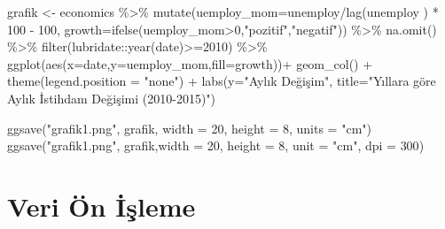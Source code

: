 \documentclass[
  letterpaper,
  DIV=11,
  numbers=noendperiod]{scrreprt}
\newenvironment{Shaded}{\begin{snugshade}}{\end{snugshade}}
\newcommand{\AttributeTok}[1]{\textcolor[rgb]{0.40,0.45,0.13}{#1}}
\newcommand{\DecValTok}[1]{\textcolor[rgb]{0.68,0.00,0.00}{#1}}
\newcommand{\FunctionTok}[1]{\textcolor[rgb]{0.28,0.35,0.67}{#1}}
\newcommand{\NormalTok}[1]{\textcolor[rgb]{0.00,0.23,0.31}{#1}}
\newcommand{\OtherTok}[1]{\textcolor[rgb]{0.00,0.23,0.31}{#1}}
\newcommand{\SpecialCharTok}[1]{\textcolor[rgb]{0.37,0.37,0.37}{#1}}
\newcommand{\StringTok}[1]{\textcolor[rgb]{0.13,0.47,0.30}{#1}}
\begin{document}
\begin{Shaded}
\begin{Highlighting}[]
\NormalTok{grafik }\OtherTok{\textless{}{-}}\NormalTok{ economics }\SpecialCharTok{\%\textgreater{}\%} 
  \FunctionTok{mutate}\NormalTok{(}\AttributeTok{uemploy\_mom=}\NormalTok{unemploy}\SpecialCharTok{/}\FunctionTok{lag}\NormalTok{(unemploy ) }\SpecialCharTok{*} \DecValTok{100} \SpecialCharTok{{-}} \DecValTok{100}\NormalTok{,}
         \AttributeTok{growth=}\FunctionTok{ifelse}\NormalTok{(uemploy\_mom}\SpecialCharTok{\textgreater{}}\DecValTok{0}\NormalTok{,}\StringTok{"pozitif"}\NormalTok{,}\StringTok{"negatif"}\NormalTok{)) }\SpecialCharTok{\%\textgreater{}\%} 
  \FunctionTok{na.omit}\NormalTok{() }\SpecialCharTok{\%\textgreater{}\%} 
  \FunctionTok{filter}\NormalTok{(lubridate}\SpecialCharTok{::}\FunctionTok{year}\NormalTok{(date)}\SpecialCharTok{\textgreater{}=}\DecValTok{2010}\NormalTok{) }\SpecialCharTok{\%\textgreater{}\%} 
  \FunctionTok{ggplot}\NormalTok{(}\FunctionTok{aes}\NormalTok{(}\AttributeTok{x=}\NormalTok{date,}\AttributeTok{y=}\NormalTok{uemploy\_mom,}\AttributeTok{fill=}\NormalTok{growth))}\SpecialCharTok{+}
  \FunctionTok{geom\_col}\NormalTok{() }\SpecialCharTok{+}
  \FunctionTok{theme}\NormalTok{(}\AttributeTok{legend.position =} \StringTok{"none"}\NormalTok{) }\SpecialCharTok{+}
  \FunctionTok{labs}\NormalTok{(}\AttributeTok{y=}\StringTok{"Aylık Değişim"}\NormalTok{,}
       \AttributeTok{title=}\StringTok{"Yıllara göre Aylık İstihdam Değişimi (2010{-}2015)"}\NormalTok{)}

\FunctionTok{ggsave}\NormalTok{(}\StringTok{"grafik1.png"}\NormalTok{, grafik, }\AttributeTok{width =} \DecValTok{20}\NormalTok{, }\AttributeTok{height =} \DecValTok{8}\NormalTok{, }\AttributeTok{units =} \StringTok{"cm"}\NormalTok{)}
\FunctionTok{ggsave}\NormalTok{(}\StringTok{"grafik1.png"}\NormalTok{, grafik,}\AttributeTok{width =} \DecValTok{20}\NormalTok{, }\AttributeTok{height =} \DecValTok{8}\NormalTok{, }\AttributeTok{unit =} \StringTok{"cm"}\NormalTok{, }\AttributeTok{dpi =} \DecValTok{300}\NormalTok{)}
\end{Highlighting}
\end{Shaded}


\hypertarget{veri-uxf6n-iux15fleme}{%
\chapter*{Veri Ön İşleme}\label{veri-uxf6n-iux15fleme}}
\end{document}
